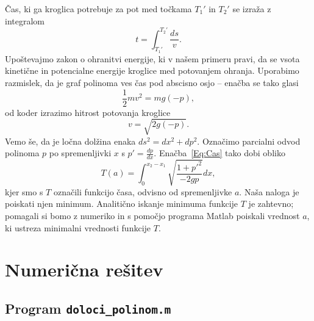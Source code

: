 \documentclass[a4paper]{article}
\begin{document}
Čas, ki ga kroglica potrebuje za pot med točkama $T_{1}'$ in $T_{2}'$ se izraža z integralom 
\begin{equation}
\label{Eq:Cas}
t = \int_{T_{1}'}^{T_{2}'} \frac{ds}{v}.
\end{equation}
%
Upoštevajmo zakon o ohranitvi energije, ki v našem primeru pravi, da se vsota kinetične in potencialne energije kroglice med potovanjem ohranja. Uporabimo razmislek, da je graf polinoma ves čas pod abscisno osjo -- enačba se tako glasi
\begin{equation*}
\frac{1}{2}mv^2 = mg(-p),
\end{equation*}
od koder izrazimo hitrost potovanja kroglice
\begin{equation*}
v = \sqrt{2g(-p)}.
\end{equation*}
%
Vemo še, da je ločna dolžina enaka $ds^2 = dx^2 + dp^2$. Označimo parcialni odvod polinoma $p$ po spremenljivki $x$ s $p'=\frac{dp}{dx}$. Enačba~\eqref{Eq:Cas} tako dobi obliko
\begin{equation}
\label{Eq:CasInt}
T(a) = \int_{0}^{x_2-x_1} \sqrt{ \frac{1+p'^2}{-2gp}} dx,
\end{equation}
kjer smo s $T$ označili funkcijo časa, odvisno od spremenljivke $a$. Naša naloga je poiskati njen minimum.
Analitično iskanje minimuma funkcije $T$ je zahtevno; pomagali si bomo z numeriko in s pomočjo programa Matlab poiskali vrednost $a$, ki ustreza minimalni vrednosti funkcije $T$.

\section{Numerična rešitev}

\subsection{Program \texttt{doloci\_polinom.m}}
\end{document}
